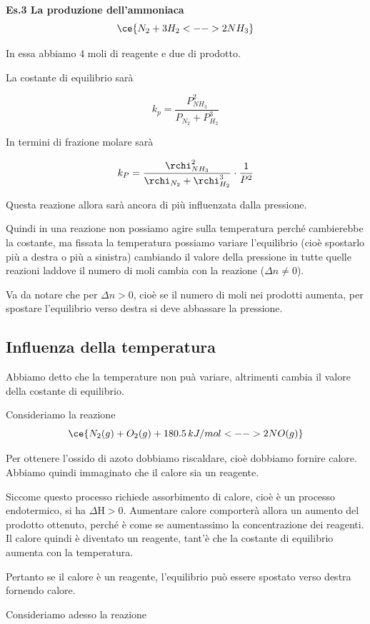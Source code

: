 \vspace{0.2cm}\textbf{Es.3 La produzione dell'ammoniaca}
$$\ce{N_2 + 3H_2 <--> 2NH_3}$$

In essa abbiamo 4 moli di reagente e due di prodotto.

La costante di equilibrio sarà

$$k_p = \frac{P_{NH_3}^2}{P_{N_2} + P_{H_2}^3}$$

In termini di frazione molare sarà

$$k_P = \frac{\rchi_{NH_3}^2}{\rchi_{N_2} + \rchi_{H_2}^3} \cdot \frac{1}{P^2}$$

Questa reazione allora sarà ancora di più influenzata dalla pressione.

\vspace{0.2cm}Quindi in una reazione non possiamo agire sulla temperatura perché cambierebbe la costante, ma fissata la temperatura possiamo variare l'equilibrio (cioè spostarlo più a destra o più a sinistra) cambiando il valore della pressione in tutte quelle reazioni laddove il numero di moli cambia con la reazione ($\Delta n \neq 0$).

\vspace{0.2cm}Va da notare che per $\Delta n > 0$, cioè se il numero di moli nei prodotti aumenta, per spostare l'equilibrio verso destra si deve abbassare la pressione.

\subsection{Influenza della temperatura}
Abbiamo detto che la temperature non puà variare, altrimenti cambia il valore della costante di equilibrio.

Consideriamo la reazione
$$\ce{N_2(g) + O_2(g) + 180.5 \, kJ/mol <--> 2NO(g)}$$

Per ottenere l'ossido di azoto dobbiamo riscaldare, cioè dobbiamo fornire calore. Abbiamo quindi immaginato che il calore sia un reagente.

Siccome questo processo richiede assorbimento di calore, cioè è un processo endotermico, si ha $\Delta$H$>0$. Aumentare calore comporterà allora un aumento del prodotto ottenuto, perché è come se aumentassimo la concentrazione dei reagenti. Il calore quindi è diventato un reagente, tant'è che la costante di equilibrio aumenta con la temperatura.

Pertanto se il calore è un reagente, l'equilibrio può essere spostato verso destra fornendo calore.

Consideriamo adesso la reazione

